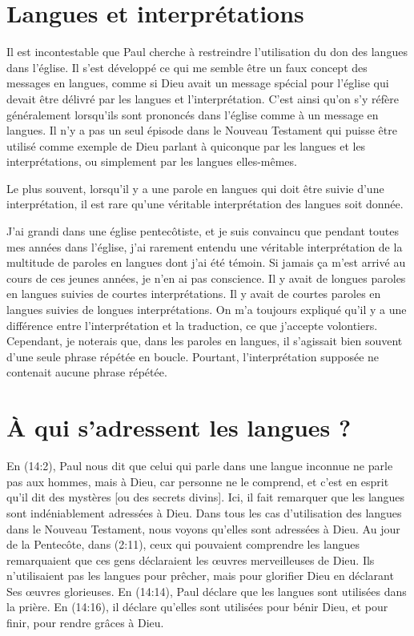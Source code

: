 \section{Langues et interpr\'etations}

Il est incontestable que Paul cherche à restreindre l'utilisation
 du don des langues dans l'église. Il s'est développé ce qui me semble
 être un faux concept des \Og messages \Fg{} en langues,
 comme si Dieu avait un message spécial pour l'église qui devait être délivré
 par les langues et l'interprétation. C'est ainsi qu'on s'y réfère
 généralement lorsqu'ils sont prononcés dans l'église
 \ocadr comme à un message en langues.
 Il n'y a pas un seul épisode dans le Nouveau Testament
 qui puisse être utilisé comme exemple de Dieu parlant à quiconque
 par les langues et les interprétations, ou simplement par les langues
 elles-mêmes.

Le plus souvent, lorsqu'il y a une parole en langues qui doit être suivie
 d'une interprétation, il est rare qu'une véritable interprétation
 des langues soit donnée.

J'ai grandi dans une église pentecôtiste, et je suis convaincu que pendant
 toutes mes années dans l'église, j'ai rarement entendu une véritable
 interprétation de la multitude de paroles en langues dont j'ai été témoin.
 Si jamais ça m'est arrivé au cours de ces jeunes années, je n'en ai pas conscience.
 Il y avait de longues paroles en langues suivies de courtes interprétations.
 Il y avait de courtes paroles en langues suivies de longues interprétations.
 On m'a toujours expliqué qu'il y a une différence entre l'interprétation
 et la traduction, ce que j'accepte volontiers. Cependant, je noterais que,
 dans les paroles en langues, il s'agissait bien souvent d'une seule phrase
 répétée en boucle. Pourtant, l'interprétation supposée ne contenait aucune phrase
 répétée.


\section{\`A qui s'adressent les langues ?}


En (14:2), Paul nous dit que celui qui parle dans une
 langue inconnue \Og ne parle pas aux hommes, mais à Dieu, car personne
 ne le comprend, et c'est en esprit qu'il dit des mystères
 [ou des secrets divins]. \Fg{} Ici, il fait remarquer que les langues
 sont indéniablement adressées à Dieu. Dans tous les cas d'utilisation
 des langues dans le Nouveau Testament, nous voyons qu'elles sont adressées
 à Dieu. Au jour de la Pentecôte, dans (2:11),
 ceux qui pouvaient comprendre les langues remarquaient que ces gens
 déclaraient les œuvres merveilleuses de Dieu. Ils n'utilisaient pas
 les langues pour prêcher, mais pour glorifier Dieu
 en déclarant Ses œuvres glorieuses.
 En (14:14), Paul déclare que les langues sont utilisées
 dans la prière. En (14:16), il déclare
 qu'elles sont utilisées pour bénir Dieu, et pour finir,
 pour rendre grâces à Dieu.

